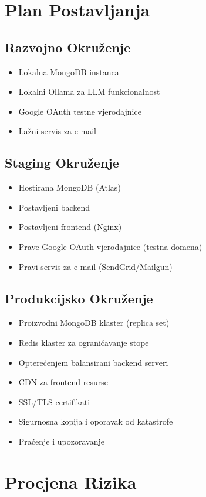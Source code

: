 \documentclass[12pt,a4paper]{article}
\begin{document}
\section{Plan Postavljanja}

\subsection{Razvojno Okruženje}
\begin{itemize}
    \item Lokalna MongoDB instanca
    \item Lokalni Ollama za LLM funkcionalnost
    \item Google OAuth testne vjerodajnice
    \item Lažni servis za e-mail
\end{itemize}

\subsection{Staging Okruženje}
\begin{itemize}
    \item Hostirana MongoDB (Atlas)
    \item Postavljeni backend
    \item Postavljeni frontend (Nginx)
    \item Prave Google OAuth vjerodajnice (testna domena)
    \item Pravi servis za e-mail (SendGrid/Mailgun)
\end{itemize}

\subsection{Produkcijsko Okruženje}
\begin{itemize}
    \item Proizvodni MongoDB klaster (replica set)
    \item Redis klaster za ograničavanje stope
    \item Opterećenjem balansirani backend serveri
    \item CDN za frontend resurse
    \item SSL/TLS certifikati
    \item Sigurnosna kopija i oporavak od katastrofe
    \item Praćenje i upozoravanje
\end{itemize}

\section{Procjena Rizika}
\end{document}

